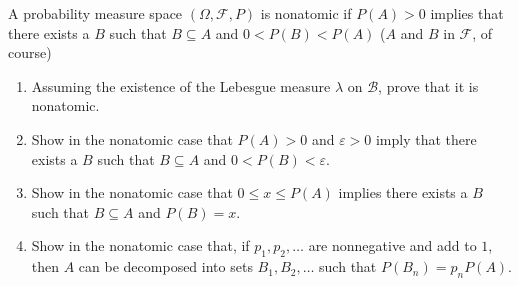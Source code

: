 \documentclass[11pt]{article}
\newcommand{\seq}{\subseteq}
\newcommand{\e}{\varepsilon}
\newcommand{\Om}{\Omega}
\newcommand{\mc}{\mathcal}
\newenvironment{exercise}[2][Exercise]{\begin{trivlist}
\item[\hskip \labelsep {\bfseries #1}\hskip \labelsep {\bfseries #2.}]}{\end{trivlist}}
\begin{document}
\begin{exercise}{2.19}
    A probability measure space $(\Om, \mc F, P)$ is nonatomic if $P(A) > 0$ implies that there exists a $B$ such that $B \seq A$ and $0 < P(B) < P(A)$ ($A$ and $B$ in $\mc F$, of course)
    \begin{enumerate}
        \item Assuming the existence of the Lebesgue measure $\lambda$ on $\mc B$, prove that it is nonatomic.
        \item Show in the nonatomic case that $P(A) > 0$ and $\e > 0$ imply that there exists a $B$ such that $B \seq A$ and $0 < P(B) < \e$.
        \item Show in the nonatomic case that $0 \leq x \leq P(A)$ implies there exists a $B$ such that $B \seq A$ and $P(B) = x$.
        \item Show in the nonatomic case that, if $p_1, p_2, \ldots$ are nonnegative and add to $1$, then $A$ can be decomposed into sets $B_1, B_2, \ldots$ such that $P(B_n) = p_n P(A)$.
    \end{enumerate}
\end{exercise}
\end{document}
